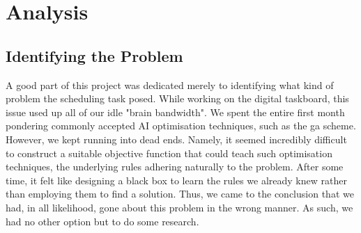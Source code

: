 \section{Analysis}
\subsection{Identifying the Problem}
A good part of this project was dedicated merely to identifying what kind of problem the scheduling task posed. While working on the digital taskboard, this issue used up all of our idle "brain bandwidth". We spent the entire first month pondering commonly accepted AI optimisation techniques, such as the \acrshort{ga} scheme. However, we kept running into dead ends. Namely, it seemed incredibly difficult to construct a suitable objective function that could teach such optimisation techniques, the underlying rules adhering naturally to the problem. After some time, it felt like designing a black box to learn the rules we already knew rather than employing them to find a solution. Thus, we came to the conclusion that we had, in all likelihood, gone about this problem in the wrong manner. As such, we had no other option but to do some research.

